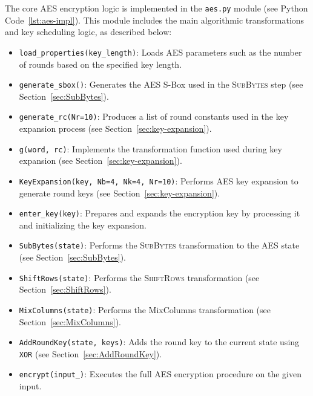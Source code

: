 The core AES encryption logic is implemented in the \texttt{aes.py} module (see Python Code~\ref{lst:aes-impl}). 
This module includes the main algorithmic transformations and key scheduling logic, as described below:
\begin{itemize}
    \item \texttt{load\_properties(key\_length)}: Loads AES parameters such as the number of rounds based on the specified key length.
    \item \texttt{generate\_sbox()}: Generates the AES S-Box used in the \textsc{SubBytes} step (see Section~\ref{sec:SubBytes}).
    \item \texttt{generate\_rc(Nr=10)}: Produces a list of round constants used in the key expansion process (see Section~\ref{sec:key-expansion}).
    \item \texttt{g(word, rc)}: Implements the transformation function used during key expansion (see Section~\ref{sec:key-expansion}).
    \item \texttt{KeyExpansion(key, Nb=4, Nk=4, Nr=10)}: Performs AES key expansion to generate round keys (see Section~\ref{sec:key-expansion}).
    \item \texttt{enter\_key(key)}: Prepares and expands the encryption key by processing it and initializing the key expansion.
    \item \texttt{SubBytes(state)}: Performs the \textsc{SubBytes} transformation to the AES state (see Section~\ref{sec:SubBytes}).
    \item \texttt{ShiftRows(state)}: Performs the \textsc{ShiftRows} transformation (see Section~\ref{sec:ShiftRows}).
    \item \texttt{MixColumns(state)}: Performs the MixColumns transformation (see Section~\ref{sec:MixColumns}).
    \item \texttt{AddRoundKey(state, keys)}: Adds the round key to the current state using \texttt{XOR} (see Section~\ref{sec:AddRoundKey}).
    \item \texttt{encrypt(input\_)}: Executes the full AES encryption procedure on the given input.
\end{itemize}